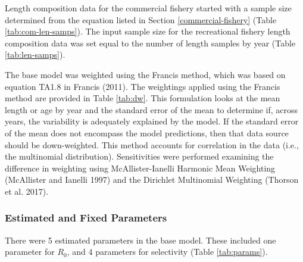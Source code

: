 \documentclass[11pt,
  english,
  letterpaper,
]{article}
\begin{document}

Length composition data for the commercial fishery started with a sample size determined from the equation listed in Section \ref{commercial-fishery} (Table \ref{tab:com-len-samps}). The input sample size for the recreational fishery length composition data was set equal to the number of length samples by year (Table \ref{tab:len-samps}).

\leavevmode\tagmcend\tagstructend\par


The base model was weighted using the Francis method, which was based on equation TA1.8 in Francis {(2011)\leavevmode\tagmcend\tagstructend}. The weightings applied using the Francis method are provided in Table \ref{tab:dw}. This formulation looks at the mean length or age by year and the standard error of the mean to determine if, across years, the variability is adequately explained by the model. If the standard error of the mean does not encompass the model predictions, then that data source should be down-weighted. This method accounts for correlation in the data (i.e., the multinomial distribution). Sensitivities were performed examining the difference in weighting using McAllister-Ianelli Harmonic Mean Weighting {(McAllister and Ianelli 1997)\leavevmode\tagmcend\tagstructend} and the Dirichlet Multinomial Weighting {(Thorson et al. 2017)\leavevmode\tagmcend\tagstructend}.

\leavevmode\tagmcend\tagstructend\par


\hypertarget{estimated-and-fixed-parameters}{%
\subsubsection{Estimated and Fixed Parameters}\label{estimated-and-fixed-parameters}}

\leavevmode\tagmcend\tagstructend


There were 5 estimated parameters in the base model. These included one parameter for {\(R_0\)\leavevmode\tagmcend\tagstructend}, and 4 parameters for selectivity (Table \ref{tab:params}).
\end{document}

